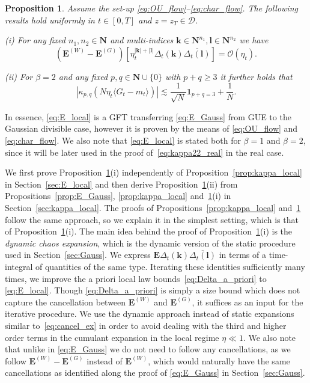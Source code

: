 \documentclass[10pt]{amsart}
\newtheorem{proposition}[theorem]{Proposition}
\numberwithin{equation}{section}
\newcommand{\E}{\mathbf{E}}
\newcommand{\N}{\mathbf{N}}
\begin{document}
\begin{proposition}\label{prop:E_local} Assume the set-up \eqref{eq:OU_flow}--\eqref{eq:char_flow}. The following results hold uniformly in $t\in [0,T]$ and $z=z_T\in\mathcal{D}$.

\noindent \emph{(i)} For any fixed $n_1,n_2\in\N$ and multi-indices $\bm{k}\in \N^{n_1},\bm{l}\in\N^{n_2}$ we have
\begin{equation}
\left(\E^{(W)}-\E^{(G)}\right)\left[\eta_t^{|\bm{k}|+|\bm{l}|}\Delta_t(\bm{k}) \overline{\Delta_t(\bm{l})}\right] =\mathcal{O}(\eta_t).
\label{eq:E_local}
\end{equation}

\noindent \emph{(ii)} For $\beta=2$ and any fixed $p,q\in\N\cup\{0\}$ with $p+q\ge 3$ it further holds that
\begin{equation}
\left\vert \kappa_{p,q}\left(N\eta_t\langle G_t-m_t\rangle\right)\right\vert \lesssim  \frac{1}{\sqrt{N}}\bm{1}_{p+q=3} + \frac{1}{N}.
\label{eq:main_pq_local}
\end{equation}

\end{proposition}

In essence, \eqref{eq:E_local} is a GFT transferring \eqref{eq:E_Gauss} from GUE to the Gaussian divisible case, however it is proven by the means of \eqref{eq:OU_flow} and \eqref{eq:char_flow}. We also note that \eqref{eq:E_local} is stated both for $\beta=1$ and $\beta=2$, since it will be later used in the proof of~\eqref{eq:kappa22_real} in the real case.


We first prove Proposition~\ref{prop:E_local}(i) independently of Proposition~\ref{prop:kappa_local} in Section~\ref{sec:E_local} and then derive Proposition~\ref{prop:E_local}(ii) from Propositions~\ref{prop:E_Gauss}, \ref{prop:kappa_local} and~\ref{prop:E_local}(i) in Section~\ref{sec:kappa_local}. The proofs of  Propositions~\ref{prop:kappa_local} and~\ref{prop:E_local} follow the same approach, so we explain it in the simplest setting, which is that of Proposition~\ref{prop:E_local}(i). The main idea behind the proof of Proposition~\ref{prop:E_local}(i) is the \emph{dynamic chaos expansion}, which is the dynamic version of the static procedure used in Section~\ref{sec:Gauss}. We express $\E \Delta_t(\bm{k})\overline{\Delta_t(\bm{l})}$ in terms of a time-integral of quantities of the same type. Iterating these identities sufficiently many times, we improve the a priori local law bounds~\eqref{eq:Delta_a_priori} to \eqref{eq:E_local}. Though \eqref{eq:Delta_a_priori} is simply a size bound which does not capture the cancellation between $\E^{(W)}$ and $\E^{(G)}$, it suffices as an input for the iterative procedure. We use the dynamic approach instead of static expansions similar to~\eqref{eq:cancel_ex} in order to avoid dealing with the third and higher order terms in the cumulant expansion in the local regime $\eta\ll 1$. We also note that unlike in \eqref{eq:E_Gauss} we do not need to follow any cancellations, as we follow $\E^{(W)}-\E^{(G)}$ instead of $\E^{(W)}$, which would naturally have the same cancellations as identified along the proof of  \eqref{eq:E_Gauss} in Section~\ref{sec:Gauss}. 
\end{document}
